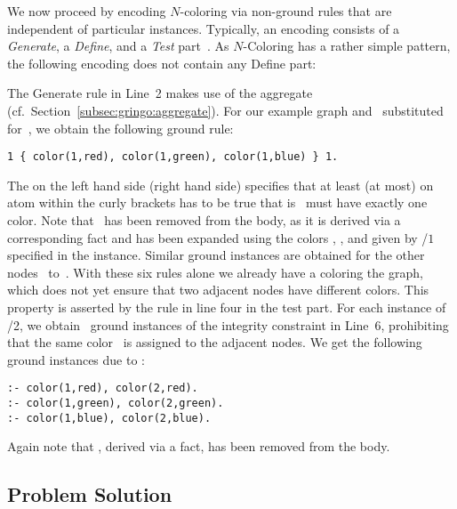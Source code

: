 We now proceed by encoding $N$-coloring via non-ground rules that are
independent of particular instances.
Typically, an encoding consists of a \emph{Generate}, a \emph{Define},
and a \emph{Test} part~\cite{lifschitz02a}.
As $N$-Coloring has a rather simple pattern, the following encoding does
not contain any Define part:
%

%
The Generate rule in Line~2 makes use of the  aggregate
(cf.\ Section~\ref{subsec:gringo:aggregate}).
For our example graph and~ substituted for~,
we obtain the following ground rule:%
%
\begin{lstlisting}[numbers=none]
1 { color(1,red), color(1,green), color(1,blue) } 1.
\end{lstlisting}
%
The  on the left hand side (right hand side) specifies that at least (at most) on atom within the curly brackets has to be true
that is~ must have exactly one color.
Note that~ has been removed from the body,
as it is derived via a corresponding fact and  has been expanded using 
the colors , , and  given by /$1$ specified in the instance.
Similar ground instances are obtained for the other nodes~ to~.
With these six rules alone we already have a coloring the graph,
which does not yet ensure that two adjacent nodes have different colors.
This property is asserted by the rule in line four in the test part.
For each instance of /2,
we obtain~ ground instances of the integrity constraint in Line~6,
prohibiting that the same color~ is assigned to the adjacent nodes.
We get the following ground instances due to :
%
\begin{lstlisting}[numbers=none]
:- color(1,red), color(2,red).
:- color(1,green), color(2,green).
:- color(1,blue), color(2,blue).
\end{lstlisting}
%
Again note that ,
derived via a fact, has been removed from the body.

\subsection{Problem Solution}\label{subsec:color:solution}


